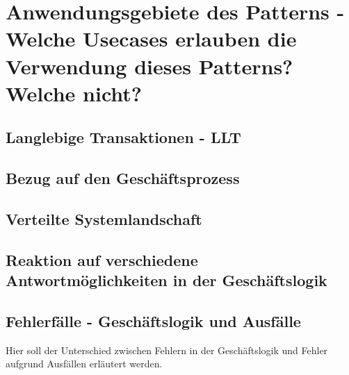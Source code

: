\section{Anwendungsgebiete des Patterns - Welche Usecases erlauben die Verwendung dieses Patterns? Welche nicht?}

\subsection{Langlebige Transaktionen - LLT}
\subsection{Bezug auf den Geschäftsprozess}
\subsection{Verteilte Systemlandschaft}
\subsection{Reaktion auf verschiedene Antwortmöglichkeiten in der Geschäftslogik}
\subsection{Fehlerfälle - Geschäftslogik und Ausfälle}
Hier soll der Unterschied zwischen Fehlern in der Geschäftslogik und Fehler aufgrund Ausfällen erläutert werden.
